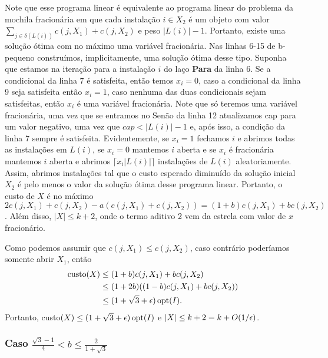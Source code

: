 Note que esse programa linear é equivalente ao programa linear do problema da mochila fracionária em que cada instalação $i \in X_2$ é um objeto com valor ${\sum_{j \in \delta(L(i))} c(j,X_1) + c(j,X_2)}$ e peso $|L(i)| - 1$. Portanto, existe uma solução ótima com no máximo uma variável fracionária. Nas linhas 6-15 de {\sc b-pequeno} construímos, implicitamente, uma solução ótima desse tipo. Suponha que estamos na iteração para a instalação $i$ do laço {\bf Para} da linha 6. Se a condicional da linha 7 é satisfeita, então temos $x_i = 0$, caso a condicional da linha 9 seja satisfeita então $x_i = 1$, caso nenhuma das duas condicionais sejam satisfeitas, então $x_i$ é uma variável fracionária. Note que só teremos uma variável fracionária, uma vez que se entramos no {\sc Senão} da linha 12 atualizamos cap para um valor negativo, uma vez que $cap < |L(i)| - 1$ e, após isso, a condição da linha 7 sempre é satisfeita. Evidentemente, se $x_i = 1$ fechamos $i$ e abrimos todas as instalações em $L(i)$, se $x_i = 0$ mantemos $i$ aberta e se $x_i$ é fracionária mantemos $i$ aberta e abrimos $\lceil x_i |L(i)|\rceil$ instalações de $L(i)$ aleatoriamente. Assim, abrimos instalações tal que o custo esperado diminuído da solução inicial $X_2$ é pelo menos o valor da solução ótima desse programa linear. Portanto, o custo de $X$ é no máximo $2c(j,X_1) + c(j,X_2) -a (c(j,X_1) + c(j,X_2)) = (1 + b)c(j,X_1) + bc(j,X_2)$. Além disso, $|X| \leq k + 2$, onde o termo aditivo 2 vem da estrela com valor de $x$ fracionário.

Como podemos assumir que $c(j,X_1) \leq c(j,X_2)$, caso contrário poderíamos somente abrir $X_1$, então
\begin{align}
    \text{custo}(X) &\leq (1+b) c(j,X_1) + bc(j,X_2) \nonumber \\
    &\leq (1+2b)((1-b)c(j,X_1) + bc(j,X_2)) \nonumber \\
    &\leq (1 +\sqrt{3} + \epsilon)\,\mathrm{opt}(I). \nonumber
\end{align}
Portanto, custo$(X) \leq (1+\sqrt{3} + \epsilon)\,\mathrm{opt}(I)$ e $|X| \leq k + 2 = k + O (1/\epsilon)$.
\subsubsection{Caso $\frac{\sqrt{3} - 1}{4} < b \leq \frac{2}{1 + \sqrt{3}}$}

